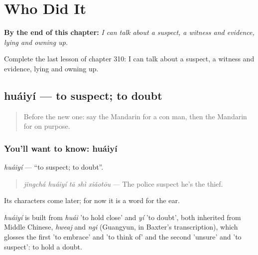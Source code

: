 
\chapter{Who Did It}
\label{ch:zh-who-did-it}

\begin{chapteropening}
\textbf{By the end of this chapter:} \emph{I can talk about a suspect, a witness and evidence, lying and owning up.}

Complete the last lesson of chapter 310: I can talk about a suspect, a witness and evidence, lying and owning up.
\end{chapteropening}

\section[huáiyí]{huáiyí — to suspect; to doubt}

\label{lesson:ZH-C310-huaiyi}



\begin{quote}
Before the new one: say the Mandarin for a con man, then the Mandarin for on purpose.
\end{quote}

\subsection*{You'll want to know: huáiyí}
\emph{huáiyí} — \textquotedblleft{}to suspect; to doubt\textquotedblright{}.

\begin{quote}
\emph{jǐngchá huáiyí tā shì xiǎotōu} — The police suspect he's the thief.
\end{quote}

Its characters come later; for now it is a word for the ear.

\begin{cousinweb}
\emph{huáiyí} is built from \emph{huái} 'to hold close' and \emph{yí} 'to doubt', both inherited from Middle Chinese, \emph{hweaj} and \emph{ngi} (Guangyun, in Baxter's transcription), which glosses the first 'to embrace' and 'to think of' and the second 'unsure' and 'to suspect': to hold a doubt.
\end{cousinweb}

